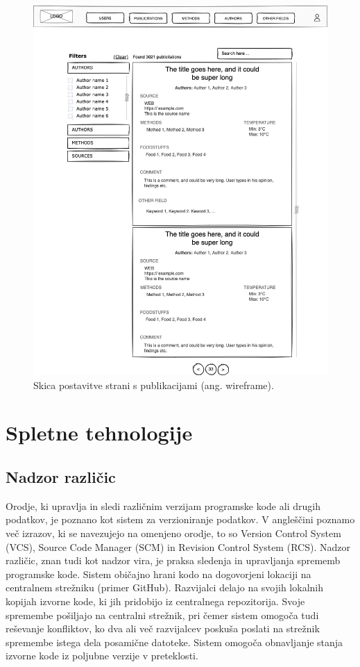 \documentclass[a4paper, 12pt]{book}
\begin{document}
\begin{figure}[h]
\begin{center}
\includegraphics[width=1\textwidth]{slike/wireframe.png}
\end{center}
\caption{ Skica postavitve strani s publikacijami (ang. wireframe). }
\label{wireframe}
\end{figure}

\clearpage

\section{Spletne tehnologije}
\subsection{Nadzor različic}
\label{version-control}
Orodje, ki upravlja in sledi različnim verzijam programske kode ali drugih podatkov, je poznano kot sistem za verzioniranje podatkov. V angleščini poznamo več izrazov, ki se navezujejo na omenjeno orodje, to so Version Control System (VCS), Source Code Manager (SCM) in Revision Control System (RCS). Nadzor različic, znan tudi kot nadzor vira, je praksa sledenja in upravljanja sprememb programske kode. Sistem običajno hrani kodo na dogovorjeni lokaciji na centralnem strežniku (primer GitHub). Razvijalci delajo na svojih lokalnih kopijah izvorne kode, ki jih pridobijo iz centralnega repozitorija. Svoje spremembe pošiljajo na centralni strežnik, pri čemer sistem omogoča tudi reševanje konfliktov, ko dva ali več razvijalcev poskuša poslati na strežnik spremembe istega dela posamične datoteke. Sistem omogoča obnavljanje stanja izvorne kode iz poljubne verzije v preteklosti.
\end{document}
